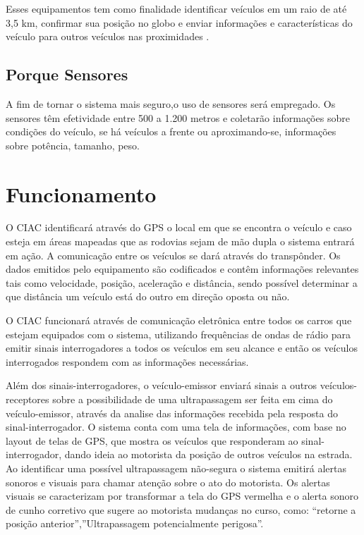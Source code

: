 Esses equipamentos  tem como finalidade identificar veículos em um raio de até 3,5 km, confirmar sua posição no globo e enviar informações e características do veículo para outros veículos nas proximidades \cite{transponder}.

\subsection{Porque Sensores}

A fim de tornar o sistema mais seguro,o uso de sensores será empregado. Os sensores têm efetividade entre 500 a 1.200 metros e coletarão informações sobre condições do veículo, se há veículos a frente ou aproximando-se, informações sobre potência, tamanho, peso.

\section{Funcionamento}

O CIAC identificará através do GPS o local em que se encontra o veículo e caso esteja em áreas mapeadas que as rodovias sejam de mão dupla o sistema entrará em ação.
A comunicação entre os veículos se dará através do transpônder. Os dados emitidos pelo equipamento são codificados e contêm informações relevantes tais como velocidade, posição, aceleração e distância, sendo possível determinar a que distância um veículo está do outro em direção oposta ou não.

O CIAC funcionará através de comunicação eletrônica entre todos os carros que estejam equipados com o sistema, utilizando frequências de ondas de rádio para emitir sinais interrogadores a todos os veículos em seu alcance e então os veículos interrogados respondem com as informações necessárias.

Além dos sinais-interrogadores, o veículo-emissor enviará sinais a outros veículos-receptores sobre a possibilidade de uma ultrapassagem ser feita em cima do veículo-emissor, através da analise das informações recebida pela resposta do sinal-interrogador.
O sistema conta com uma tela de informações, com base no layout de telas de GPS, que mostra os veículos que responderam ao sinal-interrogador, dando ideia ao motorista da posição de outros veículos na estrada.
Ao identificar uma possível ultrapassagem não-segura o sistema emitirá alertas sonoros e visuais para chamar atenção sobre o ato do motorista. Os alertas visuais se caracterizam por transformar a tela do GPS vermelha e o alerta sonoro de cunho corretivo que sugere ao motorista mudanças no curso, como: “retorne a posição anterior”,”Ultrapassagem potencialmente perigosa”.

